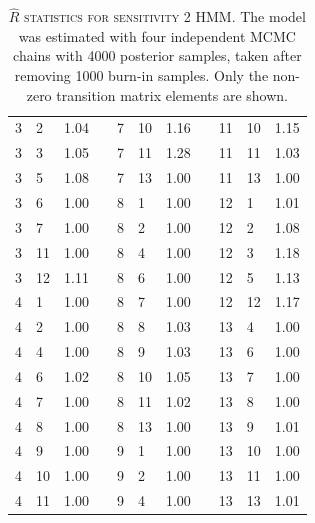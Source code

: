 \begin{table}[h!]
\begin{tabular}{llrp{0.2cm}llrp{0.2cm}llr}
 3 & 2 & 1.04  & & 7 & 10 & 1.16 & & 11 & 10 & 1.15 \\
 3 & 3 & 1.05  & & 7 & 11 & 1.28 & & 11 & 11 & 1.03 \\
 3 & 5 & 1.08  & & 7 & 13 & 1.00 & & 11 & 13 & 1.00 \\
 3 & 6 & 1.00  & & 8 & 1 & 1.00 &  &12 & 1 & 1.01 \\
 3 & 7 & 1.00  & & 8 & 2 & 1.00 &  &12 & 2 & 1.08 \\
 3 & 11 & 1.00 &  & 8 & 4 & 1.00 & & 12 & 3 & 1.18 \\
 3 & 12 & 1.11 &  & 8 & 6 & 1.00 & & 12 & 5 & 1.13 \\
 4 & 1 & 1.00  & & 8 & 7 & 1.00 &  &12 & 12 & 1.17 \\
 4 & 2 & 1.00  & & 8 & 8 & 1.03 &  &13 & 4 & 1.00 \\
 4 & 4 & 1.00  & & 8 & 9 & 1.03 &  &13 & 6 & 1.00 \\
 4 & 6 & 1.02  & & 8 & 10 & 1.05 & & 13 & 7 & 1.00 \\
 4 & 7 & 1.00  & & 8 & 11 & 1.02 & & 13 & 8 & 1.00 \\
 4 & 8 & 1.00  & & 8 & 13 & 1.00 & & 13 & 9 & 1.01 \\
 4 & 9 & 1.00  & & 9 & 1 & 1.00 &  &13 & 10 & 1.00 \\
 4 & 10 & 1.00 &  & 9 & 2 & 1.00 & & 13 & 11 & 1.00 \\
 4 & 11 & 1.00 &  & 9 & 4 & 1.00 & & 13 & 13 & 1.01 \\
 \bottomrule
 \end{tabular}
 \caption[Convergence statistics for sensitivity 2 HMM]{\textsc{$\hat{R}$ statistics for sensitivity 2 HMM}. The model was estimated with four independent MCMC chains with \num{4000} posterior samples, taken after removing \num{1000} burn-in samples. Only the non-zero transition matrix elements are shown.} \label{tab:sens_2_gelman_rubin}
\end{table}

